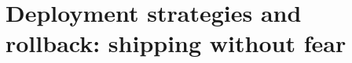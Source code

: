 \chapter{Deployment strategies and rollback: shipping without fear}
\label{ch:deployment-strategies-and-rollback}

